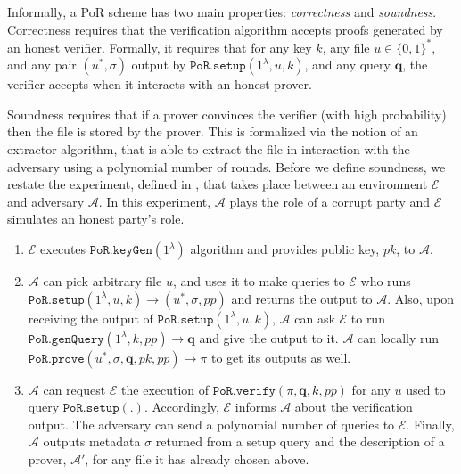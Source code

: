 Informally, a PoR scheme has two main properties: \emph{correctness} and \emph{soundness}. Correctness requires that the verification algorithm accepts  proofs generated by an honest verifier. Formally, it requires that for any key $k$, any file $u\in\{0,1\}^{\scriptscriptstyle *}$, and any  pair $(u^{*},\sigma)$ output by $\mathtt{PoR.setup}(1^{\scriptscriptstyle\lambda}, u,k)$, and any query $\bm{q}$, the verifier  accepts when it interacts with an honest prover.

 Soundness requires that if a prover convinces the verifier (with high probability) then the file is stored by the prover. This is formalized via the notion of an extractor algorithm, that is able to extract the file in interaction with the adversary using a polynomial number of  rounds. Before we define  soundness, we restate the  experiment, defined in \cite{DBLP:conf/asiacrypt/ShachamW08}, that takes place between an environment $\mathcal{E}$ and  adversary $\mathcal{A}$. In this experiment, $\mathcal{A}$ plays the role of a corrupt party and $\mathcal{E}$ simulates an honest party's role. 


\begin{enumerate}
\item $\mathcal{E}$ executes $\mathtt{PoR.keyGen}(1^{\scriptscriptstyle\lambda})$ algorithm and provides public key, $pk$, to $\mathcal{A}$.   
\item $\mathcal{A}$ can pick  arbitrary file $u$, and  uses it to make queries to  $\mathcal{E}$ who runs  $\mathtt{PoR.setup}(1^{\scriptscriptstyle\lambda}, u,k)\rightarrow (u^{\scriptscriptstyle *}, \sigma, { pp})$   and returns the output to $\mathcal{A}$. Also, upon receiving the output of $\mathtt{PoR.setup}(1^{\scriptscriptstyle\lambda}, u,k)$, $\mathcal{A}$ can ask $\mathcal{E}$  to run   $\mathtt{PoR.genQuery}(1^{\scriptscriptstyle\lambda},k,{ pp})\rightarrow \bm{q}$ and give the output to it. $\mathcal{A}$ can locally run $\mathtt{PoR.prove}(u^{\scriptscriptstyle *}, \sigma, \bm{q},pk,{ pp})\rightarrow \pi$ to get its outputs as well. 
\item $\mathcal{A}$ can request $\mathcal{E}$ the execution of $\mathtt{PoR.verify}(\pi,\bm{q},k,{ pp})$ for any $u$ used to query $\mathtt{PoR.setup}(.)$. Accordingly, $\mathcal{E}$ informs  $\mathcal{A}$ about the verification output. The adversary can send a polynomial number of queries to $\mathcal{E}$. Finally, $\mathcal{A}$ outputs metadata $\sigma$ returned from a setup query and the description of a prover, $\mathcal{A}'$, for any file it has already chosen above. 
\end{enumerate}

